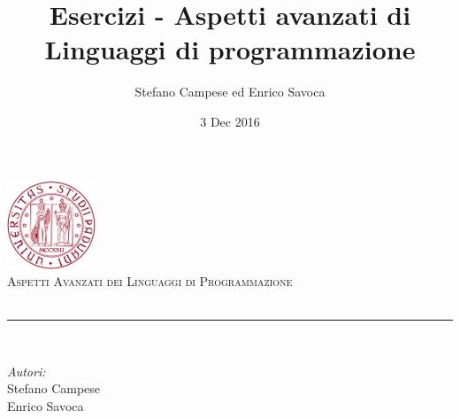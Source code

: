 \documentclass[12pt]{article}
\title{Esercizi - Aspetti avanzati di Linguaggi di programmazione}                                %
\author{Stefano Campese ed Enrico Savoca}                               %
\date{3 Dec 2016}                                         %
\makeatletter
\let\thetitle\@title
\makeatother
\begin{document}

\begin{titlepage}
    \centering
    \vspace*{0.5 cm}
    \includegraphics[scale = 0.75]{logo.png}\\[1.0 cm]  %
    \textsc{\LARGE Aspetti Avanzati dei Linguaggi \newline\newline di Programmazione}\\[2.0 cm]  %
    { \huge \bfseries \thetitle}\\
    \rule{\linewidth}{0.2 mm} \\[1.5 cm]
    
    \begin{minipage}{0.4\textwidth}
        \begin{flushleft} \large
            \emph{Autori:}\\
            Stefano Campese\\
            Enrico Savoca\\
        \end{flushleft}
    \end{minipage}~
    
    
    
    
    
    
    
\end{titlepage}


\tableofcontents 
\pagebreak

  



\newpage


\end{document}
